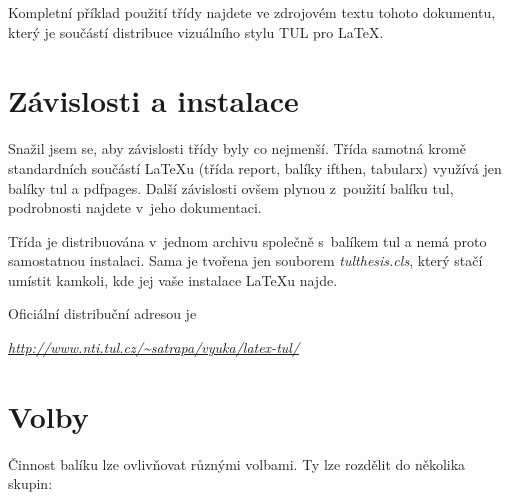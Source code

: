 \documentclass[FM,BP]{tulthesis}
\newcommand{\argument}[1]{{\ttfamily\color{\tulcolor}#1}}
\newenvironment{myquote}{\begin{list}{}{\setlength\leftmargin\parindent}\item[]}{\end{list}}
\newenvironment{listing}{\begin{myquote}\color{\tulcolor}}{\end{myquote}}
\begin{document}
Kompletní příklad použití třídy najdete ve zdrojovém textu tohoto dokumentu,
který je součástí distribuce vizuálního stylu TUL pro \LaTeX.


\chapter{Závislosti a instalace}

Snažil jsem se, aby závislosti třídy byly co nejmenší. Třída samotná kromě
standardních součástí \LaTeX u (třída \argument{report}, balíky
\argument{ifthen}, \argument{tabularx}) využívá jen balíky \argument{tul} a
\argument{pdfpages}. Další závislosti ovšem plynou z~použití balíku
\argument{tul}, podrobnosti najdete v~jeho dokumentaci.

Třída je distribuována v~jednom archivu společně s~balíkem \argument{tul} a
nemá proto samostatnou instalaci. Sama je tvořena jen souborem
\emph{tulthesis.cls}, který stačí umístit kamkoli, kde jej vaše instalace
\LaTeX u najde. 

Oficiální distribuční adresou je

\begin{listing}
\href{http://www.nti.tul.cz/~satrapa/vyuka/latex-tul/}{\emph{http://www.nti.tul.cz/\textasciitilde satrapa/vyuka/latex-tul/}}
\end{listing}


\chapter{Volby}

Činnost balíku lze ovlivňovat různými volbami. Ty lze rozdělit do několika
skupin:
\end{document}
